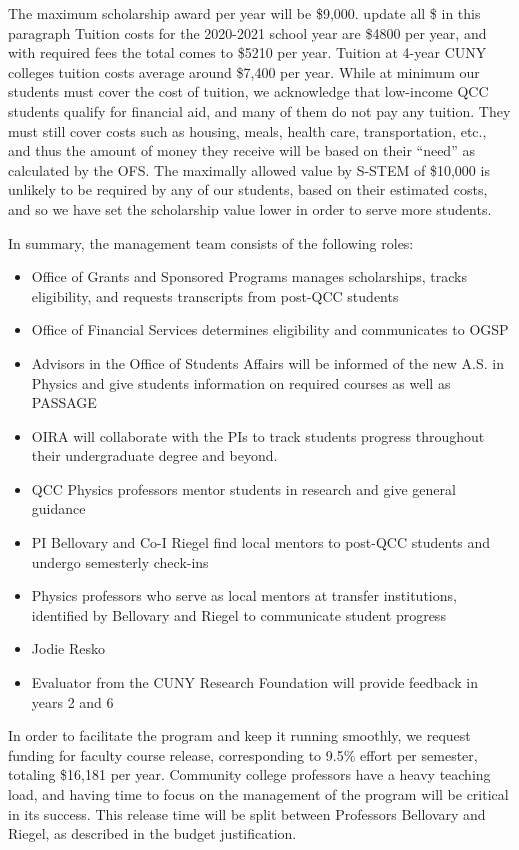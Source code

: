 \documentclass[12pt]{article}
\newcommand\new[1]{{\color{blue}#1}}
\begin{document}
The maximum scholarship award per year will be \$9,000. \new{update all \$ in this paragraph} Tuition costs for the 2020-2021 school year are \$4800 per year, and with required fees the total comes to \$5210 per year.  Tuition at 4-year CUNY colleges tuition costs average around \$7,400 per year.  While at minimum our students must cover the cost of tuition, we acknowledge that low-income QCC students qualify for financial aid, and many of them do not pay any tuition.  They must still cover costs such as housing, meals, health care, transportation, etc., and thus the amount of money they receive will be based on their ``need'' as calculated by the OFS.   The maximally allowed value by S-STEM of \$10,000 is unlikely to be required by any of our students, based on their estimated costs, and so we have set the scholarship value lower in order to serve more students.

In summary, the management team consists of the following roles:
\begin{itemize}
\setlength{\itemsep}{-\parsep}
\setlength{\topsep}{-\parsep}
\setlength{\partopsep}{-\parsep}
	\item Office of Grants and Sponsored Programs manages scholarships, tracks eligibility, and requests transcripts from post-QCC students
	\item Office of Financial Services determines eligibility and communicates to OGSP
		\item Advisors in the Office of Students Affairs will be informed of the new A.S. in Physics and give students information on required courses as well as PASSAGE
	\item OIRA will collaborate with the PIs to track students progress throughout their undergraduate degree and beyond.   
	\item QCC Physics professors mentor students in research and give general guidance
	\item PI Bellovary and Co-I Riegel find local mentors to post-QCC students and undergo semesterly check-ins
	\item Physics professors who serve as local mentors at transfer institutions, identified by Bellovary and Riegel to communicate student progress
	\item \new{ Jodie Resko}
	\item Evaluator from the CUNY Research Foundation will provide feedback in years 2 and 6
\end{itemize}	

In order to facilitate the program and keep it running smoothly, we request funding for faculty course release, corresponding to 9.5\% effort per semester, totaling \$16,181 per year.  Community college professors have a heavy teaching load, and having time to focus on the management of the program will be critical in its success.  This release time will be split between Professors Bellovary and Riegel, as described in the budget justification.
\end{document}
